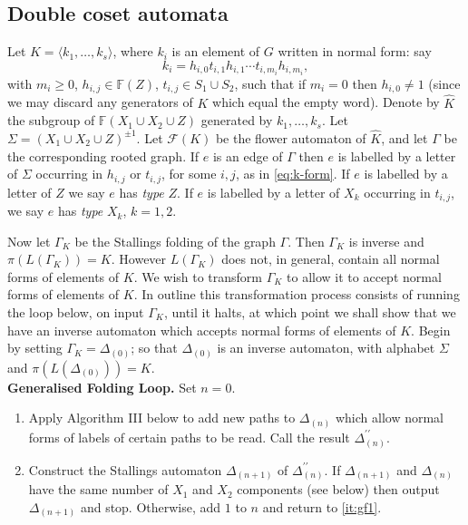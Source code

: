 \documentclass[a4paper,12pt]{article}
\newcommand{\G}{\Gamma }
\newcommand{\D}{\Delta }
\renewcommand{\S}{\Sigma }
\newcommand{\cF}{{\cal{F}}}
\numberwithin{equation}{section}
\numberwithin{figure}{section}
\newcommand{\FF}{\ensuremath{\mathbb{F}}}
\renewcommand{\cF}{\mathcal{F}}
\newcommand{\la}{\langle}
\newcommand{\ra}{\rangle}
\newcommand{\be}{\begin{enumerate}}
\newcommand{\ee}{\end{enumerate}}
\begin{document}
\subsection{Double coset automata}\label{sec:dca}
%
%
Let $K=\la k_1, \ldots , k_s\ra$, where $k_i$ is an element of $G$
written in normal form: say
\begin{equation}\label{eq:k-form}
k_i= h_{i,0}t_{i,1}h_{i,1}\cdots t_{i,m_i}h_{i,m_i},
\end{equation}
with $m_i\ge 0$, $h_{i,j}\in \FF(Z)$, $t_{i,j}\in S_1\cup S_2$, such that
if $m_i=0$ then
$h_{i,0}\neq 1$ (since we may discard any generators of $K$ which equal
the empty word). Denote
by $\hat K$ the subgroup of  $\FF(X_1\cup X_2 \cup Z)$ generated by
$k_1, \ldots , k_s$. Let $\S=(X_1\cup X_2 \cup Z)^{\pm 1}$.
Let $\cF(K)$ be the flower automaton of $\hat K$, and let
$\G$ be the corresponding rooted graph. If $e$ is an edge of $\G$ then
$e$ is labelled by a letter of $\S$
occurring in $h_{i,j}$ or $t_{i,j}$, for some $i,j$, as in
\eqref{eq:k-form}. If $e$ is labelled by a letter of $Z$ we say $e$ has {\em type} $Z$.
If $e$ is labelled by a letter of $X_k$ occurring in $t_{i,j}$, we
say $e$ has {\em type} $X_k$, $k = 1,2$.

Now let $\G_K$ be the Stallings folding of the graph $\G$.  Then
 $\G_K$ is inverse and $\pi(L(\G_K))=K$. However
$L(\G_K)$ does not, in general, contain all normal forms of elements of $K$.
We wish to transform $\G_K$ to allow it to accept normal forms of
elements of $K$. In outline this transformation process consists of
running the loop below, on input $\G_K$,
until it halts, at which point we shall show that we have an
inverse automaton which accepts  normal forms of elements of $K$.
Begin by setting $\G_K=\D_{(0)}$; so  that $\D_{(0)}$ is an inverse automaton, with alphabet $\S$
and $\pi(L(\D_{(0)}))=K$. \\[1em]
\textbf{Generalised Folding Loop.}
Set $n=0$.
\be[Step 1]
\item\label{it:gf1} Apply Algorithm III below to add new paths to $\D_{(n)}$ which allow normal forms of labels
of certain paths to be read. %
Call the result $\D_{(n)}^{\prime\prime}$.
\item\label{it:gf2} Construct the Stallings automaton $\D_{(n+1)}$
of $\D_{(n)}^{\prime\prime}$. If $\D_{(n+1)}$ and
$\D_{(n)}$ have the same
 number of
$X_1$ and $X_2$ components (see below) then output $\D_{(n+1)}$
and stop. Otherwise, add $1$ to $n$ and  return to   \ref{it:gf1}.
\ee
\end{document}
